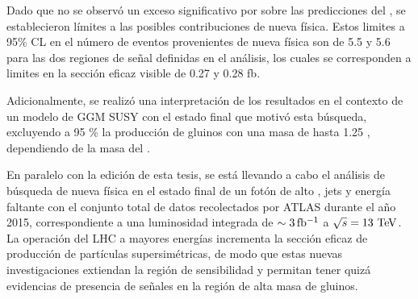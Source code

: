 Dado que no se observó un exceso significativo por sobre las predicciones del
{\SM}, se establecieron límites a las posibles contribuciones de nueva física.
Estos limites a 95\% CL en el número de eventos provenientes de nueva física son
de 5.5 y 5.6 para las dos regiones de señal definidas en el análisis, los cuales
se corresponden a limites en la sección eficaz visible de 0.27 y 0.28 fb.


Adicionalmente, se realizó una interpretación de los resultados en el contexto
de un modelo de GGM SUSY con el estado final que motivó esta búsqueda, excluyendo
a 95 \% {\cl} la producción de gluinos con una masa de hasta 1.25 \tev, dependiendo de la masa
del {\ninoone}.


En paralelo con la edición de esta tesis, se está llevando a cabo el análisis de
búsqueda de nueva física en el estado final de un fotón de alto {\pt}, jets y
energía faltante con el conjunto total de datos recolectados por ATLAS durante
el a\~no 2015, correspondiente a una luminosidad integrada de $\sim
\unit[3]{fb^{-1}}$ a $\sqrt{s}=13 \tev$. La operación del LHC a
mayores energías incrementa la sección eficaz de producción de partículas
supersimétricas, de modo que estas nuevas investigaciones extiendan la región de
sensibilidad y permitan tener quizá evidencias de presencia de se\~nales en la
región de alta masa de gluinos.
